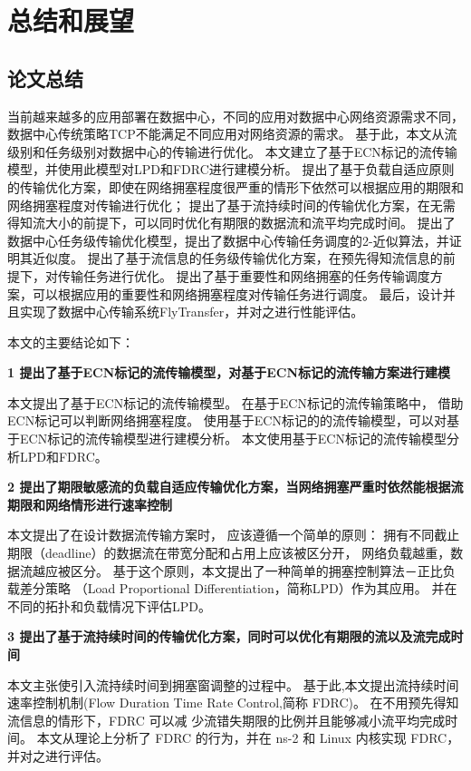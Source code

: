 \chapter{总结和展望} \label{cha:conclusion}
\section{论文总结}
当前越来越多的应用部署在数据中心，不同的应用对数据中心网络资源需求不同，数据中心传统策略TCP不能满足不同应用对网络资源的需求。
基于此，本文从流级别和任务级别对数据中心的传输进行优化。
本文建立了基于ECN标记的流传输模型，并使用此模型对LPD和FDRC进行建模分析。
提出了基于负载自适应原则的传输优化方案，即使在网络拥塞程度很严重的情形下依然可以根据应用的期限和网络拥塞程度对传输进行优化；
提出了基于流持续时间的传输优化方案，在无需得知流大小的前提下，可以同时优化有期限的数据流和流平均完成时间。
提出了数据中心任务级传输优化模型，提出了数据中心传输任务调度的2-近似算法，并证明其近似度。
提出了基于流信息的任务级传输优化方案，在预先得知流信息的前提下，对传输任务进行优化。
提出了基于重要性和网络拥塞的任务传输调度方案，可以根据应用的重要性和网络拥塞程度对传输任务进行调度。
最后，设计并且实现了数据中心传输系统FlyTransfer，并对之进行性能评估。

本文的主要结论如下：

\textbf{1 提出了基于ECN标记的流传输模型，对基于ECN标记的流传输方案进行建模}

本文提出了基于ECN标记的流传输模型。
在基于ECN标记的流传输策略中，
借助ECN标记可以判断网络拥塞程度。
使用基于ECN标记的的流传输模型，可以对基于ECN标记的流传输模型进行建模分析。
本文使用基于ECN标记的流传输模型分析LPD和FDRC。


\textbf{2 提出了期限敏感流的负载自适应传输优化方案，当网络拥塞严重时依然能根据流期限和网络情形进行速率控制}

本文提出了在设计数据流传输方案时，
应该遵循一个简单的原则：
拥有不同截止期限（deadline）的数据流在带宽分配和占用上应该被区分开，
网络负载越重，数据流越应被区分。
基于这个原则，本文提出了一种简单的拥塞控制算法－正比负载差分策略
（Load Proportional Differentiation，简称LPD）作为其应用。
并在不同的拓扑和负载情况下评估LPD。


\textbf{3 提出了基于流持续时间的传输优化方案，同时可以优化有期限的流以及流完成时间}

本文主张使引入流持续时间到拥塞窗调整的过程中。
基于此,本文提出流持续时间速率控制机制(Flow Duration Time Rate Control,简称 FDRC)。
在不用预先得知流信息的情形下，FDRC 可以减 少流错失期限的比例并且能够减小流平均完成时间。
本文从理论上分析了 FDRC 的行为，并在 ns-2 和 Linux 内核实现 FDRC，并对之进行评估。



